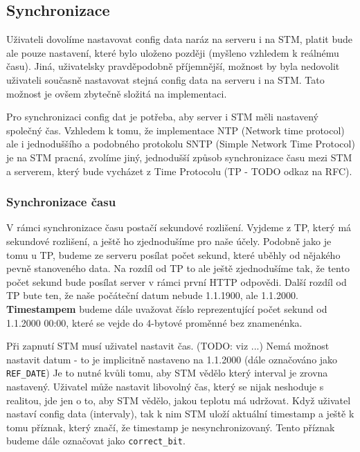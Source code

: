 \subsection{Synchronizace}

Uživateli dovolíme nastavovat config data naráz na serveru i na STM, platit bude ale pouze
nastavení, které bylo uloženo později (myšleno vzhledem k reálnému času).
Jiná, uživatelsky pravděpodobně příjemnější, možnost by byla nedovolit uživateli současně
nastavovat stejná config data na serveru i na STM.
Tato možnost je ovšem zbytečně složitá na implementaci.

Pro synchronizaci config dat je potřeba, aby server i STM měli nastavený společný čas.
Vzhledem k tomu, že implementace NTP (Network time protocol) ale i jednoduššího a podobného
protokolu SNTP (Simple Network Time Protocol) je na STM pracná, zvolíme jiný, jednodušší způsob synchronizace
času mezi STM a serverem, který bude vycházet z Time Protocolu (TP - TODO odkaz na RFC).

\subsubsection{Synchronizace času}
V rámci synchronizace času postačí sekundové rozlišení.
Vyjdeme z TP, který má sekundové rozlišení, a ještě ho zjednodušíme pro naše účely.
Podobně jako je tomu u TP, budeme ze serveru posílat počet sekund, které
uběhly od nějakého pevně stanoveného data.
Na rozdíl od TP to ale ještě zjednodušíme tak, že tento počet sekund bude posílat server
v rámci první HTTP odpovědi.
Další rozdíl od TP bute ten, že naše počáteční datum nebude 1.1.1900, ale 1.1.2000.
\textbf{Timestampem} budeme dále uvažovat číslo reprezentující počet sekund od 1.1.2000 00:00,
které se vejde do 4-bytové proměnné bez znamenénka.

Při zapnutí STM musí uživatel nastavit čas. (TODO: viz ...)
Nemá možnost nastavit datum - to je implicitně nastaveno na 1.1.2000 (dále označováno jako \texttt{REF\_DATE})
Je to nutné kvůli tomu, aby STM vědělo který interval je zrovna nastavený.
Uživatel může nastavit libovolný čas, který se nijak neshoduje s realitou, jde jen o to,
aby STM vědělo, jakou teplotu má udržovat.
Když uživatel nastaví config data (intervaly), tak k nim STM uloží aktuální timestamp
a ještě k tomu příznak, který značí, že timestamp je nesynchronizovaný.
Tento příznak budeme dále označovat jako \texttt{correct\_bit}.

